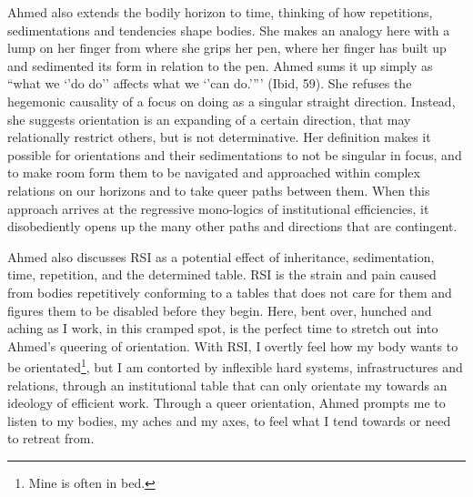 Ahmed also extends the bodily horizon to time, thinking of how
repetitions, sedimentations and tendencies shape bodies. She makes an
analogy here with a lump on her finger from where she grips her pen,
where her finger has built up and sedimented its form in relation to the
pen. Ahmed sums it up simply as ``what we `'do do'' affects what we
`'can do.'''' (Ibid, 59). She refuses the hegemonic causality of a focus
on doing as a singular straight direction. Instead, she suggests
orientation is an expanding of a certain direction, that may
relationally restrict others, but is not determinative. Her definition
makes it possible for orientations and their sedimentations to not be
singular in focus, and to make room form them to be navigated and
approached within complex relations on our horizons and to take queer
paths between them. When this approach arrives at the regressive
mono-logics of institutional efficiencies, it disobediently opens up the
many other paths and directions that are contingent.

Ahmed also discusses RSI as a potential effect of inheritance,
sedimentation, time, repetition, and the determined table. RSI is the
strain and pain caused from bodies repetitively conforming to a tables
that does not care for them and figures them to be disabled before they
begin. Here, bent over, hunched and aching as I work, in this cramped
spot, is the perfect time to stretch out into Ahmed's queering of
orientation. With RSI, I overtly feel how my body wants to be
orientated\footnote{Mine is often in bed.}, but I am contorted by
inflexible hard systems, infrastructures and relations, through an
institutional table that can only orientate my towards an ideology of
efficient work. Through a queer orientation, Ahmed prompts me to listen
to my bodies, my aches and my axes, to feel what I tend towards or need
to retreat from.

